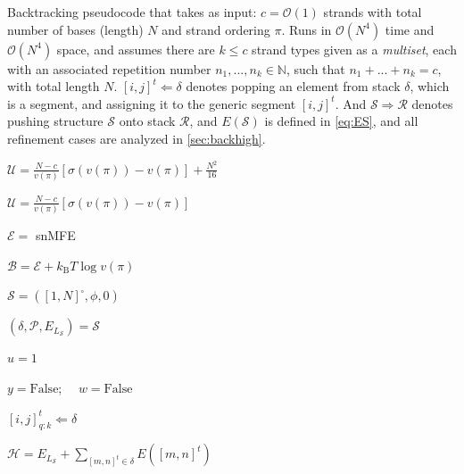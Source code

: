 \documentclass[11pt,letterpaper]{article}  \usepackage[margin=1in]{geometry}
\theoremstyle{definition}  \newtheorem{Definition}[theorem]{Definition}
\newcommand{\snMFE}{snMFE\xspace}
\begin{document}
\begin{algorithm}[t] 
	\caption{\small Backtracking pseudocode that takes as input: $c=\mathcal{O}(1)$ strands with total number of bases (length) $N$ and strand ordering $\pi$. 
		Runs in  $\mathcal{O}(N^4)$ time and $\mathcal{O}(N^4)$ space, and assumes there are $k \leq c$ strand types given as a \emph{multiset}, 
		each with an associated repetition number $n_1, ..., n_k \in \mathbb{N}$, such that $n_1+ ...+n_k = c$, with total length $N$. 
		$[i,j]^t \Leftarrow \delta$ denotes  popping an element from stack $\delta$, 
		which is a segment, and assigning it to the generic segment $[i,j]^t$.  
		And $\mathcal{S} \Rightarrow \mathcal{R}$ denotes pushing structure $\mathcal{S}$ onto stack $\mathcal{R}$, and  $E(\mathcal{S})$ is defined in \cref{eq:ES}, and all refinement cases are analyzed in \cref{sec:backhigh}.
	} \label{algo:2}
	\begin{algorithmic}[1]
		\footnotesize	
		\State $\mathcal{U} =  \frac{N-c}{v(\pi)} \left[ \sigma(v(\pi))-v(\pi) \right] + \frac{N^2}{16}$  
		
		\Else
		
		\State $\mathcal{U} =  \frac{N-c}{v(\pi)} \left[ \sigma(v(\pi))-v(\pi) \right]$
		
		\EndIf
		
		\State $\mathcal{E} =$ \snMFE \Comment{\snMFE is returned by \cref{algo:1}}
		
		\State $\mathcal{B} = \mathcal{E}+ k_\mathrm{B} T \log v(\pi)$ 
		
		
		
		\State $\mathcal{S} = ([1,N]^\square, \phi,0)$ 
		
		\State $(\delta, \mathcal{P}, E_{L_{\mathcal{S}}}) = \mathcal{S}$
		
		\State $u = 1$ 
		
		\State  $y= \mathrm{False}$; \ \ $w= \mathrm{False}$  
		
		\State $[i,j]_{q:k}^t \Leftarrow \delta$
		
		\State $\mathcal{H} = E_{L_{\mathcal{S}}} + \sum \limits_{[m,n]^t \in \delta} E([m,n]^t)$\label{line:H}
		

\end{algorithmic}
\end{algorithm}
\end{document}
